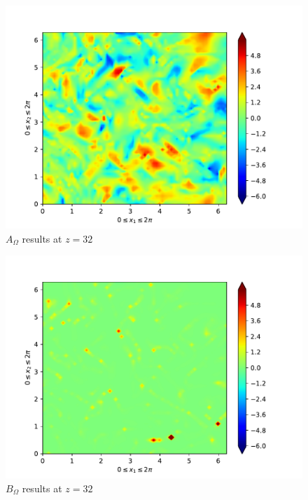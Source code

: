 \begin{figure}[H]
    \includegraphics[height=0.4\textheight]{media/run-cds-00/A-term-enstrophy}
    \caption{$A_{\Omega}$ results at $z=32$}
\end{figure}

\begin{figure}[H]
    \includegraphics[height=0.4\textheight]{media/run-cds-00/C-term-enstrophy}
    \caption{$B_{\Omega}$ results at $z=32$}
\end{figure}

